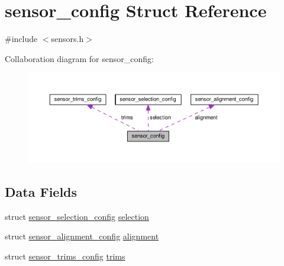 \hypertarget{structsensor__config}{\section{sensor\+\_\+config Struct Reference}
\label{structsensor__config}
}


{\ttfamily \#include $<$sensors.\+h$>$}



Collaboration diagram for sensor\+\_\+config\+:\nopagebreak
\begin{figure}[H]
\begin{center}
\leavevmode
\includegraphics[width=350pt]{structsensor__config__coll__graph}
\end{center}
\end{figure}
\subsection*{Data Fields}
\begin{DoxyCompactItemize}
\item 
struct \hyperlink{structsensor__selection__config}{sensor\+\_\+selection\+\_\+config} \hyperlink{structsensor__config_a19ca24e8e7a3296ca8c277a6368c65c9}{selection}
\item 
struct \hyperlink{structsensor__alignment__config}{sensor\+\_\+alignment\+\_\+config} \hyperlink{structsensor__config_a077e791b94c457137bf03bb5e2e2afe6}{alignment}
\item 
struct \hyperlink{structsensor__trims__config}{sensor\+\_\+trims\+\_\+config} \hyperlink{structsensor__config_aa0d0e322ad09472e27b04c80df14e4f1}{trims}
\end{DoxyCompactItemize}


